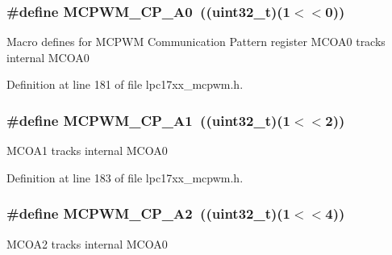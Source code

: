 \hypertarget{group___m_c_p_w_m___private___macros_ga5a9ce0ec9e5321ff49df68cec04220ea}{
\subsubsection[{\-M\-C\-P\-W\-M\-\_\-\-C\-P\-\_\-\-A0}]{\setlength{\rightskip}{0pt plus 5cm}\#define {\bf \-M\-C\-P\-W\-M\-\_\-\-C\-P\-\_\-\-A0}~((uint32\-\_\-t)(1$<$$<$0))}}\label{group___m_c_p_w_m___private___macros_ga5a9ce0ec9e5321ff49df68cec04220ea}
\-Macro defines for \-M\-C\-P\-W\-M \-Communication \-Pattern register \-M\-C\-O\-A0 tracks internal \-M\-C\-O\-A0 

\-Definition at line 181 of file lpc17xx\-\_\-mcpwm.\-h.

\hypertarget{group___m_c_p_w_m___private___macros_ga094cd45a6431cd168100c0afc4b1a0eb}{
\subsubsection[{\-M\-C\-P\-W\-M\-\_\-\-C\-P\-\_\-\-A1}]{\setlength{\rightskip}{0pt plus 5cm}\#define {\bf \-M\-C\-P\-W\-M\-\_\-\-C\-P\-\_\-\-A1}~((uint32\-\_\-t)(1$<$$<$2))}}\label{group___m_c_p_w_m___private___macros_ga094cd45a6431cd168100c0afc4b1a0eb}
\-M\-C\-O\-A1 tracks internal \-M\-C\-O\-A0 

\-Definition at line 183 of file lpc17xx\-\_\-mcpwm.\-h.

\hypertarget{group___m_c_p_w_m___private___macros_ga00ec45c4781e37400e92dd7c737dd455}{
\subsubsection[{\-M\-C\-P\-W\-M\-\_\-\-C\-P\-\_\-\-A2}]{\setlength{\rightskip}{0pt plus 5cm}\#define {\bf \-M\-C\-P\-W\-M\-\_\-\-C\-P\-\_\-\-A2}~((uint32\-\_\-t)(1$<$$<$4))}}\label{group___m_c_p_w_m___private___macros_ga00ec45c4781e37400e92dd7c737dd455}
\-M\-C\-O\-A2 tracks internal \-M\-C\-O\-A0 

